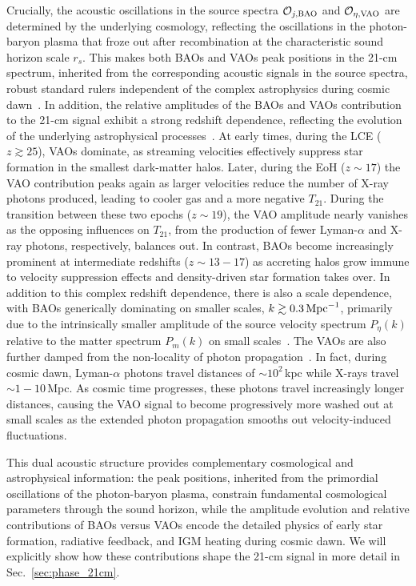 \documentclass[floats,floatfix,showpacs,amssymb,prd,twocolumn,superscriptaddress,nofootinbib,reprint,preprintnumbers]{revtex4-2}
\begin{document}
Crucially, the acoustic oscillations in the source spectra $\mathcal{O}_{j,\rm BAO}$ and $\mathcal{O}_{\eta,\rm VAO}$ are determined by the underlying cosmology, reflecting the oscillations in the photon-baryon plasma that froze out after recombination at the characteristic sound horizon scale $r_s$. This makes both BAOs and VAOs peak positions in the 21-cm spectrum, inherited from the corresponding acoustic signals in the source spectra, robust standard rulers independent of the complex astrophysics during cosmic dawn~\cite{wyithe08, wyithe08b, loeb08, chang08, seo10, munoz19b, Sarkar:2022mdz}. In addition, the relative amplitudes of the BAOs and VAOs contribution to the 21-cm signal exhibit a strong redshift dependence, reflecting the evolution of the underlying astrophysical processes~\cite{munoz20,Hotinli:2021vxg,Libanore:2023oxf, cruz24,Zhang:2024pwv, verwohlt2024}. At early times, during the LCE ($z\gtrsim 25$), VAOs dominate, as streaming velocities effectively suppress star formation in the smallest dark-matter halos. Later, during the EoH ($z\sim 17$) the VAO contribution peaks again as larger velocities reduce the number of X-ray photons produced, leading to cooler gas and a more negative $T_{21}$. During the transition between these two epochs ($z\sim 19$), the VAO amplitude nearly vanishes as the opposing influences on $T_{21}$, from the production of fewer Lyman-$\alpha$ and X-ray photons, respectively, balances out. In contrast, BAOs become increasingly prominent at intermediate redshifts ($z\sim 13-17$) as accreting halos grow immune to velocity suppression effects and density-driven star formation takes over. In addition to this complex redshift dependence, there is also a scale dependence, with BAOs generically dominating on smaller scales, $k\gtrsim 0.3\,{\rm Mpc}^{-1}$, primarily due to the intrinsically smaller amplitude of the source velocity spectrum $P_\eta(k)$ relative to the matter spectrum $P_m(k)$ on small scales~\citep{cruz25}. The VAOs are also further damped from the non-locality of photon propagation~\cite{munoz19,Cruz:2024fsv}. In fact, during cosmic dawn, Lyman-$\alpha$ photons travel distances of $\sim 10^2\,$kpc while X-rays travel $\sim 1-10\,$Mpc. As cosmic time progresses, these photons travel increasingly longer distances, causing the VAO signal to become progressively more washed out at small scales as the extended photon propagation smooths out velocity-induced fluctuations.

This dual acoustic structure provides complementary cosmological and astrophysical information: the peak positions, inherited from the primordial oscillations of the photon-baryon plasma, constrain fundamental cosmological parameters through the sound horizon, while the amplitude evolution and relative contributions of BAOs versus VAOs encode the detailed physics of early star formation, radiative feedback, and IGM heating during cosmic dawn. We will explicitly show how these contributions shape the 21-cm signal in more detail in Sec.~\ref{sec:phase_21cm}.
\end{document}
